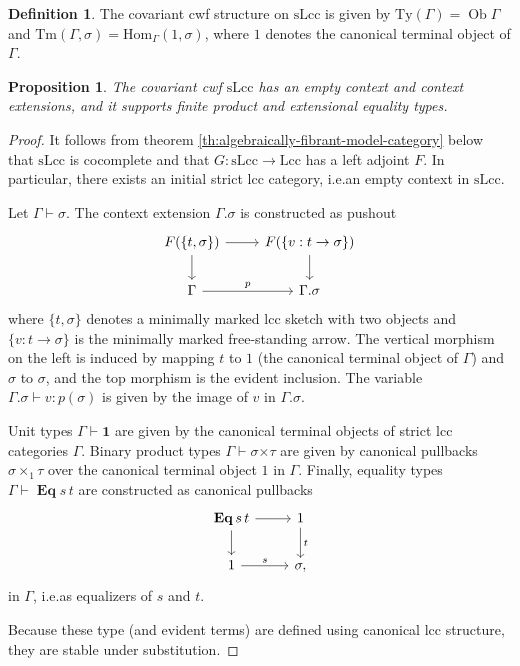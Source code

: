 \documentclass[a4paper]{article}
\newtheorem{proposition}[theorem]{Proposition}
\theoremstyle{remark}
\theoremstyle{definition}
\newtheorem{definition}[theorem]{Definition}
\begin{document}
\begin{definition}
  The covariant cwf structure on $\mathrm{sLcc}$ is given by $\mathrm{Ty}(\Gamma) = \operatorname{Ob} \Gamma$ and $\mathrm{Tm}(\Gamma, \sigma) = \mathrm{Hom}_\Gamma(1, \sigma)$, where $1$ denotes the canonical terminal object of $\Gamma$.
\end{definition}

\begin{proposition}
  \label{prop:slcc-model}
  The covariant cwf $\mathrm{sLcc}$ has an empty context and context extensions, and it supports finite product and extensional equality types.
\end{proposition}
\begin{proof}
  It follows from theorem \ref{th:algebraically-fibrant-model-category} below that $\mathrm{sLcc}$ is cocomplete and that $G : \mathrm{sLcc} \rightarrow \mathrm{Lcc}$ has a left adjoint $F$.
  In particular, there exists an initial strict lcc category, i.e.\@ an empty context in $\mathrm{sLcc}$.
  
  Let $\Gamma \vdash \sigma$.
  The context extension $\Gamma.\sigma$ is constructed as pushout
  \begin{equation}
    \label{eq:slcc-context-extension}
    \begin{tikzcd}
      F(\{ t, \sigma \}) \arrow[d] \arrow[r] & F(\{ v : t \rightarrow \sigma \}) \arrow[d] \\
      \Gamma \arrow[r, "p"] & \Gamma.\sigma
    \end{tikzcd}
  \end{equation}
  where $\{ t, \sigma \}$ denotes a minimally marked lcc sketch with two objects and $\{ v : t \rightarrow \sigma \}$ is the minimally marked free-standing arrow.
  The vertical morphism on the left is induced by mapping $t$ to $1$ (the canonical terminal object of $\Gamma$) and $\sigma$ to $\sigma$, and the top morphism is the evident inclusion.
  The variable $\Gamma.\sigma \vdash v : p(\sigma)$ is given by the image of $v$ in $\Gamma.\sigma$.

  Unit types $\Gamma \vdash \mathbf{1}$ are given by the canonical terminal objects of strict lcc categories $\Gamma$.
  Binary product types $\Gamma \vdash \sigma \mathbin{\mathbf{\times}} \tau$ are given by canonical pullbacks $\sigma \times_1 \tau$ over the canonical terminal object $1$ in $\Gamma$.
  Finally, equality types $\Gamma \vdash \operatorname{\mathbf{Eq}} s \, t$ are constructed as canonical pullbacks
  \begin{equation}
    \begin{tikzcd}
      \operatorname{\mathbf{Eq}} s \, t \arrow[r] \arrow[d] & 1 \arrow[d, "t"] \\
      1 \arrow[r, "s"] & \sigma,
    \end{tikzcd}
  \end{equation}
  in $\Gamma$, i.e.\@ as equalizers of $s$ and $t$.

  Because these type (and evident terms) are defined using canonical lcc structure, they are stable under substitution.
\end{proof}
\end{document}
